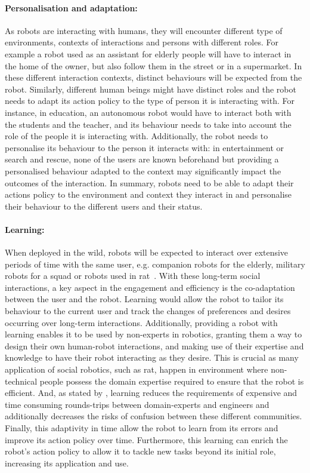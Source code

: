     \paragraph{Personalisation and adaptation: } As robots are interacting with humans, they will encounter different type of environments, contexts of interactions and persons with different roles. For example a robot used as an assistant for elderly people will have to interact in the home of the owner, but also follow them in the street or in a supermarket. In these different interaction contexts, distinct behaviours will be expected from the robot. Similarly, different human beings might have distinct roles and the robot needs to adapt its action policy to the type of person it is interacting with. For instance, in education, an autonomous robot would have to interact both with the students and the teacher, and its behaviour needs to take into account the role of the people it is interacting with. Additionally, the robot needs to personalise its behaviour to the person it interacts with: in entertainment or search and rescue, none of the users are known beforehand but providing a personalised behaviour adapted to the context may significantly impact the outcomes of the interaction. In summary, robots need to be able to adapt their actions policy to the environment and context they interact in and personalise their behaviour to the different users and their status.

	\paragraph{Learning:} When deployed in the wild, robots will be expected to interact over extensive periods of time with the same user, e.g. companion robots for the elderly, military robots for a squad or robots used in \gls{rat}~\citep{leite2013social}. With these long-term social interactions, a key aspect in the engagement and efficiency is the co-adaptation between the user and the robot. Learning would allow the robot to tailor its behaviour to the current user and track the changes of preferences and desires occurring over long-term interactions. Additionally, providing a robot with learning enables it to be used by non-experts in robotics, granting them a way to design their own human-robot interactions, and making use of their expertise and knowledge to have their robot interacting as they desire. This is crucial as many application of social robotics, such as \gls{rat}, happen in environment where non-technical people possess the domain expertise required to ensure that the robot is efficient. And, as stated by \cite{amershi2014power}, learning reduces the requirements of expensive and time consuming rounds-trips between domain-experts and engineers and additionally decreases the risks of confusion between these different communities. Finally, this adaptivity in time allow the robot to learn from its errors and improve its action policy over time. Furthermore, this learning can enrich the robot's action policy to allow it to tackle new tasks beyond its initial role, increasing its application and use.
	
